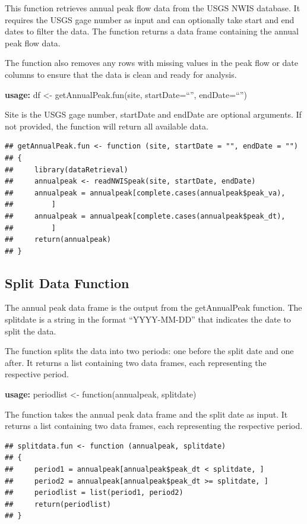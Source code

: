 \documentclass{tufte-handout}\usepackage[]{graphicx}\usepackage[]{xcolor}
\makeatletter
\newenvironment{kframe}{%
 \def\at@end@of@kframe{}%
 \ifinner\ifhmode%
  \def\at@end@of@kframe{\end{minipage}}%
  \begin{minipage}{\columnwidth}%
 \fi\fi%
 \def\FrameCommand##1{\hskip\@totalleftmargin \hskip-\fboxsep
 \colorbox{shadecolor}{##1}\hskip-\fboxsep
     \hskip-\linewidth \hskip-\@totalleftmargin \hskip\columnwidth}%
 \MakeFramed {\advance\hsize-\width
   \@totalleftmargin\z@ \linewidth\hsize
   \@setminipage}}%
 {\par\unskip\endMakeFramed%
 \at@end@of@kframe}
\newenvironment{knitrout}{}{} %
\makeatother
\begin{document}
This function retrieves annual peak flow data from the USGS NWIS database. It requires the USGS gage number as input and can optionally take start and end dates to filter the data. The function returns a data frame containing the annual peak flow data.

The function also removes any rows with missing values in the peak flow or date columns to ensure that the data is clean and ready for analysis.

\textbf{usage:} df <- getAnnualPeak.fun(site, startDate=``'', endDate=``'')

Site is the USGS gage number, startDate and endDate are optional arguments. If not provided, the function will return all available data.

\begin{knitrout}
\color{fgcolor}\begin{kframe}
\begin{verbatim}
## getAnnualPeak.fun <- function (site, startDate = "", endDate = "") 
## {
##     library(dataRetrieval)
##     annualpeak <- readNWISpeak(site, startDate, endDate)
##     annualpeak = annualpeak[complete.cases(annualpeak$peak_va), 
##         ]
##     annualpeak = annualpeak[complete.cases(annualpeak$peak_dt), 
##         ]
##     return(annualpeak)
## }
\end{verbatim}
\end{kframe}
\end{knitrout}




\subsection{Split Data Function}

The annual peak data frame is the output from the getAnnualPeak function. The splitdate is a string in the format ``YYYY-MM-DD'' that indicates the date to split the data.

The function splits the data into two periods: one before the split date and one after. It returns a list containing two data frames, each representing the respective period.

\textbf{usage:} periodlist <- function(annualpeak, splitdate)

The function takes the annual peak data frame and the split date as input. It returns a list containing two data frames, each representing the respective period.

\begin{knitrout}
\color{fgcolor}\begin{kframe}
\begin{verbatim}
## splitdata.fun <- function (annualpeak, splitdate) 
## {
##     period1 = annualpeak[annualpeak$peak_dt < splitdate, ]
##     period2 = annualpeak[annualpeak$peak_dt >= splitdate, ]
##     periodlist = list(period1, period2)
##     return(periodlist)
## }
\end{verbatim}
\end{kframe}
\end{knitrout}
\end{document}
